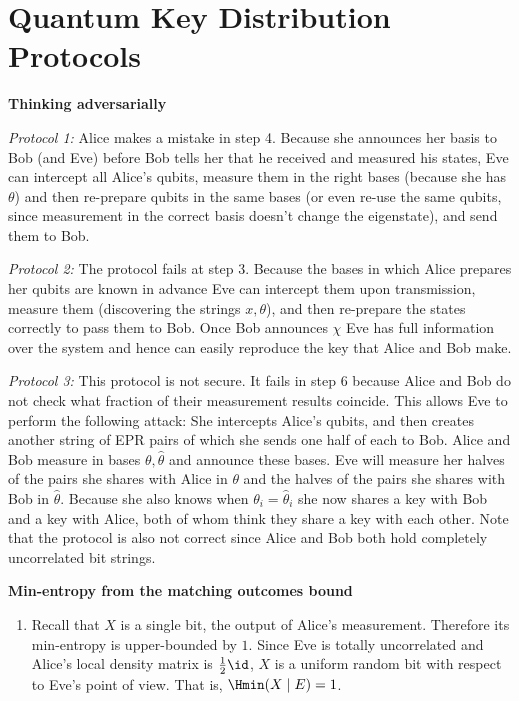 
\chapter{Quantum Key Distribution Protocols}

\begin{exercises}


\item {\bf Thinking adversarially}

\emph{Protocol 1:} Alice makes a mistake in step 4. Because she announces her basis to Bob (and Eve) before Bob tells her that he received and measured his states, Eve can intercept all Alice's qubits, measure them in the right bases (because she has \(\theta\)) and then re-prepare qubits in the same bases (or even re-use the same qubits, since measurement in the correct basis doesn't change the eigenstate), and send them to Bob.

\emph{Protocol 2:} The protocol fails at step 3. Because the bases in which Alice prepares her qubits are known in advance Eve can intercept them upon transmission, measure them (discovering the strings \(x, \theta\)), and then re-prepare the states correctly to pass them to Bob. Once Bob announces \(\chi\) Eve has full information over the system and hence can easily reproduce the key that Alice and Bob make.

\emph{Protocol 3:} This protocol is not secure. It fails in step 6 because Alice and Bob do not check what fraction of their measurement results coincide. This allows Eve to perform the following attack: She intercepts Alice's qubits, and then creates another string of EPR pairs of which she sends one half of each to Bob. Alice and Bob measure in bases \(\theta, \hat{\theta}\) and announce these bases. Eve will measure her halves of the pairs she shares with Alice in \(\theta\) and the halves of the pairs she shares with Bob in \(\hat{\theta}\). Because she also knows when \(\theta_i = \hat{\theta}_i\) she now shares a key with Bob and a key with Alice, both of whom think they share a key with each other. Note that the protocol is also not correct since Alice and Bob both hold completely uncorrelated bit strings.


\item {\bf Min-entropy from the matching outcomes bound}\label{ex:matching-min}

\begin{enumerate}
\item Recall that $X$ is a single bit, the output of Alice's measurement. Therefore its min-entropy is upper-bounded by $1$. Since Eve is totally uncorrelated and Alice's local density matrix is $\frac12\id$, $X$ is a uniform random bit with respect to Eve's point of view. That is, $\Hmin(X\mid E) = 1$.


\end{enumerate}
\end{exercises}
